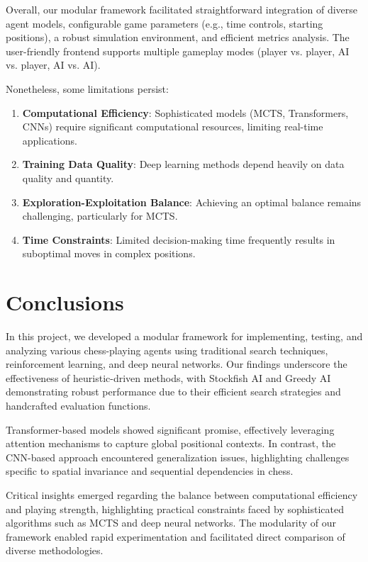 \documentclass[journal, a4paper]{IEEEtran}
\begin{document}
Overall, our modular framework facilitated straightforward integration of diverse agent models, configurable game parameters (e.g., time controls, starting positions), a robust simulation environment, and efficient metrics analysis. The user-friendly frontend supports multiple gameplay modes (player vs. player, AI vs. player, AI vs. AI).

Nonetheless, some limitations persist:
\begin{enumerate}
    \item \textbf{Computational Efficiency}: Sophisticated models (MCTS, Transformers, CNNs) require significant computational resources, limiting real-time applications.
    \item \textbf{Training Data Quality}: Deep learning methods depend heavily on data quality and quantity.
    \item \textbf{Exploration-Exploitation Balance}: Achieving an optimal balance remains challenging, particularly for MCTS.
    \item \textbf{Time Constraints}: Limited decision-making time frequently results in suboptimal moves in complex positions.
\end{enumerate}


\section{Conclusions}
\label{sec:conclusions}
\noindent In this project, we developed a modular framework for implementing, testing, and analyzing various chess-playing agents using traditional search techniques, reinforcement learning, and deep neural networks. Our findings underscore the effectiveness of heuristic-driven methods, with Stockfish AI and Greedy AI demonstrating robust performance due to their efficient search strategies and handcrafted evaluation functions.

Transformer-based models showed significant promise, effectively leveraging attention mechanisms to capture global positional contexts. In contrast, the CNN-based approach encountered generalization issues, highlighting challenges specific to spatial invariance and sequential dependencies in chess.

Critical insights emerged regarding the balance between computational efficiency and playing strength, highlighting practical constraints faced by sophisticated algorithms such as MCTS and deep neural networks. The modularity of our framework enabled rapid experimentation and facilitated direct comparison of diverse methodologies.
\end{document}
